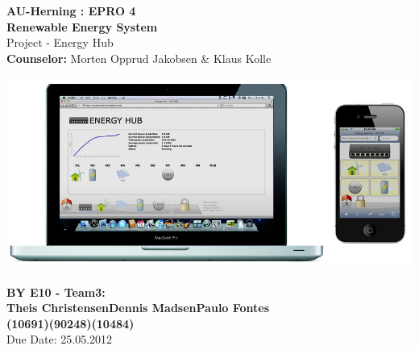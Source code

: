 \begin{centering}
\thispagestyle{empty}
\begin{center}
\textbf{\Huge {AU-Herning : EPRO 4\\[0.1cm]Renewable Energy System}}\\
\huge {Project - Energy Hub}\\ \vspace{0.4cm}
\large{\textbf{Counselor:} Morten Opprud Jakobsen \& Klaus Kolle}\\ \vspace{0.0cm}
\end{center}

\centering
\includegraphics[width=1\textwidth]{images/frontpage.png}
\end{centering}

\begin{center}
\vspace{0.4cm}
\Large{\textbf{BY E10 - Team3: \\ \vspace{0.2cm}Theis Christensen\hspace{1.5cm}Dennis Madsen\hspace{1.5cm}Paulo Fontes}
\\\textbf{(10691)\hspace{3.7cm}(90248)\hspace{3.7cm}(10484)}}
\\\vspace{3.0cm}Due Date: 25.05.2012
\end{center}

\newpage
\thispagestyle{empty}
\mbox{}